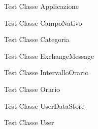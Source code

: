 \begin{frame}{Test Classe Applicazione}

    \note{
    }    
\end{frame}

\begin{frame}{Test Classe CampoNativo}
    
\end{frame}

\begin{frame}{Test Classe Categoria}
    
\end{frame}

\begin{frame}{Test Classe ExchangeMessage}
    
\end{frame}

\begin{frame}{Test Classe IntervalloOrario}
    
\end{frame}

\begin{frame}{Test Classe Orario}
    
\end{frame}

\begin{frame}{Test Classe UserDataStore}
    
\end{frame}

\begin{frame}{Test Classe User}
    
\end{frame}